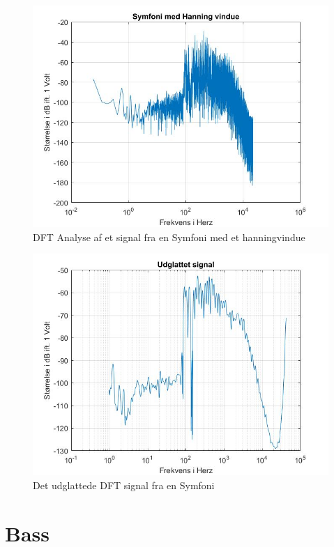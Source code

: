 \begin{figure}[H]
	\centering
	\includegraphics[width=180mm]{figures/Symfoni/hanning.jpg}
	\caption{DFT Analyse af et signal fra en Symfoni med et hanningvindue}
	\label{fig:Symfoni hanning}
\end{figure}

\begin{figure}[H]
	\centering
	\includegraphics[width=180mm]{figures/Symfoni/udglattet.jpg}
	\caption{Det udglattede DFT signal fra en Symfoni}
	\label{fig:Symfoni udglattet}
\end{figure}

\section{Bass}

